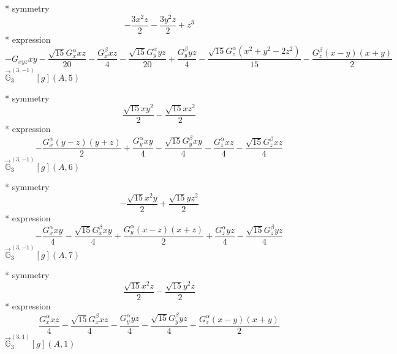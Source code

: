 \documentclass[fleqn,8pt]{jsarticle}
\begin{document}
\noindent\quad ** symmetry
\begin{dmath*}
- \frac{3 x^{2} z}{2} - \frac{3 y^{2} z}{2} + z^{3}
\end{dmath*}
\noindent\quad ** expression
\begin{dmath*}
- G_{xyz} x y - \frac{\sqrt{15} G_{x}^{\alpha} x z}{20} - \frac{G_{x}^{\beta} x z}{4} - \frac{\sqrt{15} G_{y}^{\alpha} y z}{20} + \frac{G_{y}^{\beta} y z}{4} - \frac{\sqrt{15} G_{z}^{\alpha} \left(x^{2} + y^{2} - 2 z^{2}\right)}{15} - \frac{G_{z}^{\beta} \left(x - y\right) \left(x + y\right)}{2}
\end{dmath*}
\noindent\quad $\vec{\mathbb{G}}_{3}^{(3,-1)}[g](A,5)$

\noindent\quad ** symmetry
\begin{dmath*}
\frac{\sqrt{15} x y^{2}}{2} - \frac{\sqrt{15} x z^{2}}{2}
\end{dmath*}
\noindent\quad ** expression
\begin{dmath*}
- \frac{G_{x}^{\alpha} \left(y - z\right) \left(y + z\right)}{2} + \frac{G_{y}^{\alpha} x y}{4} - \frac{\sqrt{15} G_{y}^{\beta} x y}{4} - \frac{G_{z}^{\alpha} x z}{4} - \frac{\sqrt{15} G_{z}^{\beta} x z}{4}
\end{dmath*}
\noindent\quad $\vec{\mathbb{G}}_{3}^{(3,-1)}[g](A,6)$

\noindent\quad ** symmetry
\begin{dmath*}
- \frac{\sqrt{15} x^{2} y}{2} + \frac{\sqrt{15} y z^{2}}{2}
\end{dmath*}
\noindent\quad ** expression
\begin{dmath*}
- \frac{G_{x}^{\alpha} x y}{4} - \frac{\sqrt{15} G_{x}^{\beta} x y}{4} + \frac{G_{y}^{\alpha} \left(x - z\right) \left(x + z\right)}{2} + \frac{G_{z}^{\alpha} y z}{4} - \frac{\sqrt{15} G_{z}^{\beta} y z}{4}
\end{dmath*}
\noindent\quad $\vec{\mathbb{G}}_{3}^{(3,-1)}[g](A,7)$

\noindent\quad ** symmetry
\begin{dmath*}
\frac{\sqrt{15} x^{2} z}{2} - \frac{\sqrt{15} y^{2} z}{2}
\end{dmath*}
\noindent\quad ** expression
\begin{dmath*}
\frac{G_{x}^{\alpha} x z}{4} - \frac{\sqrt{15} G_{x}^{\beta} x z}{4} - \frac{G_{y}^{\alpha} y z}{4} - \frac{\sqrt{15} G_{y}^{\beta} y z}{4} - \frac{G_{z}^{\alpha} \left(x - y\right) \left(x + y\right)}{2}
\end{dmath*}
\noindent\quad $\vec{\mathbb{G}}_{3}^{(3,1)}[g](A,1)$
\end{document}

